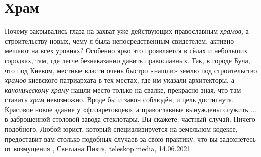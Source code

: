  
 
 
 
 
\chapter{Храм}
\label{sec:slova.hram}

Почему закрывались глаза на захват уже действующих православным \emph{храмов}, а
строительству новых, чему я была непосредственным свидетелем, активно мешают на
всех уровнях? Особенно ярко это проявляется в сёлах и небольших городках, там,
где легче безнаказанно давить православных. Так, в городе Буча, что под Киевом,
местные власти очень быстро «нашли» землю под строительство \emph{храмов} киевского
патриархата в тех местах, где им указали архитекторы, а \emph{каноническому храму}
нашли место только на свалке, прекрасно зная, что там ставить \emph{храм} невозможно.
Вроде бы и закон соблюдён, и цель достигнута. Красивое новое здание у
«филаретовцев», а православные вынуждены служить ... в заброшенной столовой
завода стеклотары. Вы скажете: частный случай. Ничего подобного. Любой юрист,
который специализируется на земельном кодексе, предоставит вам столько подобных
случаев за свою практику, что вы задохнётесь от возмущения
, 
Светлана Пикта, teleskop.media, 14.06.2021

